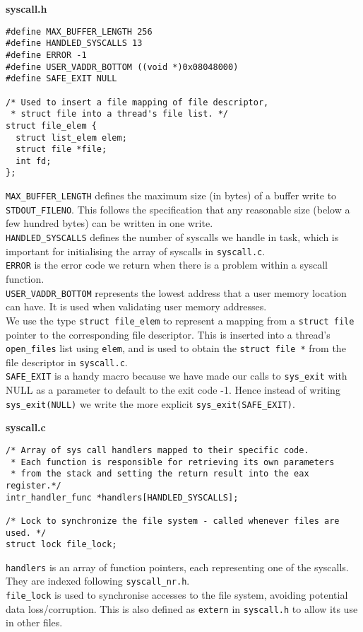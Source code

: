 \documentclass[11pt, a4paper]{article}
\begin{document}
\begin{center}\textbf{syscall.h}\end{center}
\begin{verbatim}
#define MAX_BUFFER_LENGTH 256
#define HANDLED_SYSCALLS 13
#define ERROR -1
#define USER_VADDR_BOTTOM ((void *)0x08048000)
#define SAFE_EXIT NULL

/* Used to insert a file mapping of file descriptor,
 * struct file into a thread's file list. */
struct file_elem {
  struct list_elem elem;
  struct file *file;
  int fd;
};
\end{verbatim}
\verb|MAX_BUFFER_LENGTH| defines the maximum size (in bytes) of a buffer write to \verb|STDOUT_FILENO|.
This follows the specification that any reasonable size (below a few hundred bytes) can be written in
one write.\\
\verb|HANDLED_SYSCALLS| defines the number of syscalls we handle in task, which is important for
initialising the array of syscalls in \verb|syscall.c|.\\
\verb|ERROR| is the error code we return when there is a problem within a syscall function.\\
\verb|USER_VADDR_BOTTOM| represents the lowest address that a user memory location can have. It is
used when validating user memory addresses.\\
We use the type \verb|struct file_elem| to represent a mapping from a \verb|struct file| pointer
to the corresponding file descriptor. This is inserted into a thread's \verb|open_files| list using
\verb|elem|, and is used to obtain the \verb|struct file *| from the file descriptor in \verb|syscall.c|.\\
\verb|SAFE_EXIT| is a handy macro because we have
made our calls to \verb|sys_exit| with NULL as a
parameter to
default to the exit code -1. Hence instead of writing
\verb|sys_exit(NULL)| we write the more explicit \verb|sys_exit(SAFE_EXIT)|.

\begin{center}\textbf{syscall.c}\end{center}
\begin{verbatim}
/* Array of sys call handlers mapped to their specific code.
 * Each function is responsible for retrieving its own parameters
 * from the stack and setting the return result into the eax register.*/
intr_handler_func *handlers[HANDLED_SYSCALLS];

/* Lock to synchronize the file system - called whenever files are used. */
struct lock file_lock;
\end{verbatim}
\verb|handlers| is an array of function pointers, each representing one of the syscalls. They
are indexed following \verb|syscall_nr.h|.\\
\verb|file_lock| is used to synchronise accesses to the file system, avoiding potential data
loss/corruption. This is also defined as \verb|extern| in \verb|syscall.h| to allow its use
in other files.
\end{document}
